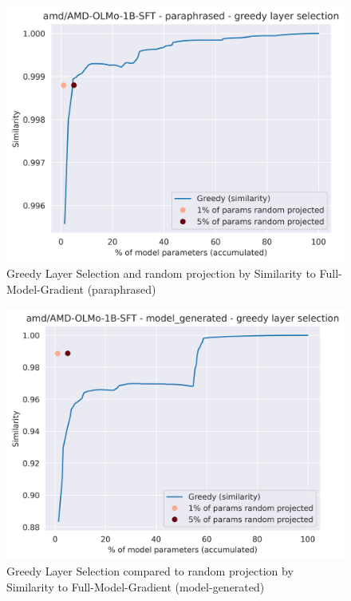\begin{figure}[ht]
    \centering
    \includegraphics[width=1\textwidth]{figures/results/paraphrased/greedy_layer_selection.png}
    \caption{Greedy Layer Selection and random projection by Similarity to Full-Model-Gradient (paraphrased) }
    \label{fig:greedy_layer_selection_paraphrased}
\end{figure}

\begin{figure}[ht]
    \centering
    \includegraphics[width=1\textwidth]{figures/results/model-generated/greedy_layer_selection.png}
    \caption{Greedy Layer Selection compared to random projection by Similarity to Full-Model-Gradient (model-generated)}
    \label{fig:greedy_layer_selection_model_generated}
\end{figure}


